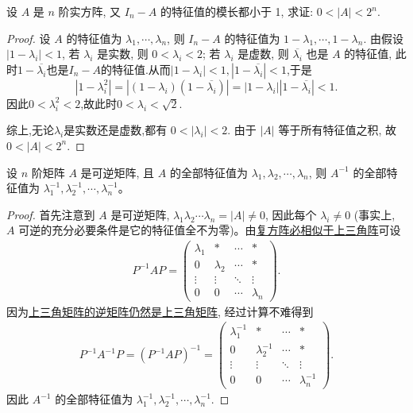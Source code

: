 \documentclass[lang=cn,newtx,10pt,scheme=chinese]{elegantbook}
\begin{document}
\begin{example}
设 \( A \) 是 \( n \) 阶实方阵, 又 \( I_n - A \) 的特征值的模长都小于 1, 求证: \( 0 < |A| < 2^n \).
\end{example}
\begin{proof}
设 \( A \) 的特征值为 \( \lambda_1, \cdots, \lambda_n \), 则 \( I_n - A \) 的特征值为 \( 1 - \lambda_1, \cdots, 1 - \lambda_n \).
由假设 \( |1 - \lambda_i| < 1 \), 若 \( \lambda_i \) 是实数, 则 \( 0 < \lambda_i < 2 \); 若 \( \lambda_i \) 是虚数, 则 \( \overline{\lambda_i} \) 也是 \( A \) 的特征值, 此时$1-\overline{\lambda_i}$也是$I_n-A$的特征值.从而$|1-\lambda_i|<1,|1-\overline{\lambda_i}|<1$,于是
\[|1-\lambda_i^2|=|(1-\lambda_i)(1-\overline{\lambda_i})|=|1-\lambda_i||1-\overline{\lambda_i}|<1.\]
因此$0<\lambda_i^2<2$,故此时$0<\lambda_i<\sqrt{2}$.

综上,无论$\lambda_i$是实数还是虚数,都有 \( 0 < |\lambda_i| < 2 \). 由于 \( |A| \) 等于所有特征值之积, 故 \( 0 < |A| < 2^n \).
\end{proof}

\begin{proposition}[逆矩阵的特征值]\label{proposition:逆矩阵的特征值}
设 $n$ 阶矩阵 $A$ 是可逆矩阵, 且 $A$ 的全部特征值为 $\lambda_1, \lambda_2, \cdots, \lambda_n$, 则 $A^{-1}$ 的全部特征值为 $\lambda_1^{-1}, \lambda_2^{-1}, \cdots, \lambda_n^{-1}$。
\end{proposition}
\begin{proof}
首先注意到 $A$ 是可逆矩阵, $\lambda_1 \lambda_2 \cdots \lambda_n = |A| \neq 0$, 因此每个 $\lambda_i \neq 0$ (事实上, $A$ 可逆的充分必要条件是它的特征值全不为零)。由\hyperref[theorem:复方阵必相似于上三角阵]{复方阵必相似于上三角阵}可设
\begin{align*}
P^{-1}AP = \begin{pmatrix}
\lambda_1 & * & \cdots & * \\
0 & \lambda_2 & \cdots & * \\
\vdots & \vdots & \ddots & \vdots \\
0 & 0 & \cdots & \lambda_n
\end{pmatrix}.
\end{align*}
因为\hyperref[proposition:上三角阵性质]{上三角矩阵的逆矩阵仍然是上三角矩阵}, 经过计算不难得到
\begin{align*}
P^{-1}A^{-1}P = (P^{-1}AP)^{-1} 
= \begin{pmatrix}
\lambda_1^{-1} & * & \cdots & * \\
0 & \lambda_2^{-1} & \cdots & * \\
\vdots & \vdots & \ddots & \vdots \\
0 & 0 & \cdots & \lambda_n^{-1}
\end{pmatrix}.
\end{align*}
因此 $A^{-1}$ 的全部特征值为 $\lambda_1^{-1}, \lambda_2^{-1}, \cdots, \lambda_n^{-1}$.
\end{proof}
\end{document}
